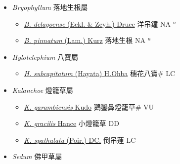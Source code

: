 
  \begin{itemize}
 \item[] \textit{Bryophyllum} 落地生根屬
                    
  \begin{itemize}
        \item[] \href{http://www.theplantlist.org/tpl1.1/search?q=Bryophyllum+delagoense}{\textit{B. delagoense} (Eckl. \& Zeyh.) Druce}   洋吊鐘 NA $^n$
        \item[] \href{http://www.theplantlist.org/tpl1.1/search?q=Bryophyllum+pinnatum}{\textit{B. pinnatum} (Lam.) Kurz}   落地生根 NA $^n$
  \end{itemize}
 \item[] \textit{Hylotelephium} 八寶屬
                    
  \begin{itemize}
        \item[] \href{http://www.theplantlist.org/tpl1.1/search?q=Hylotelephium+subcapitatum}{\textit{H. subcapitatum} (Hayata) H.Ohba}   穗花八寶\# LC
  \end{itemize}
 \item[] \textit{Kalanchoe} 燈籠草屬
                    
  \begin{itemize}
        \item[] \href{http://www.theplantlist.org/tpl1.1/search?q=Kalanchoe+garambiensis}{\textit{K. garambiensis} Kudo}   鵝鑾鼻燈籠草\# VU
        \item[] \href{http://www.theplantlist.org/tpl1.1/search?q=Kalanchoe+gracilis}{\textit{K. gracilis} Hance}   小燈籠草 DD
        \item[] \href{http://www.theplantlist.org/tpl1.1/search?q=Kalanchoe+spathulata}{\textit{K. spathulata} (Poir.) DC.}   倒吊蓮 LC
  \end{itemize}
 \item[] \textit{Sedum} 佛甲草屬
                    

\end{itemize}
